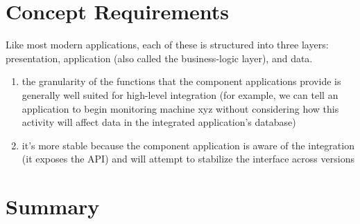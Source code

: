 \section{Concept Requirements}
Like most modern applications, each of these is structured into three layers: presentation, 
application (also called the business-logic layer), and data.
\begin{enumerate}
\item the granularity of the functions that the component applications provide is generally well
suited for high-level integration (for example, we can tell an application to begin monitoring
machine xyz without considering how this activity will affect data in the integrated application’s database)
\item it’s more stable because the component application is aware of the integration (it exposes
the API) and will attempt to stabilize the interface across versions
\end{enumerate}

\section{Summary}